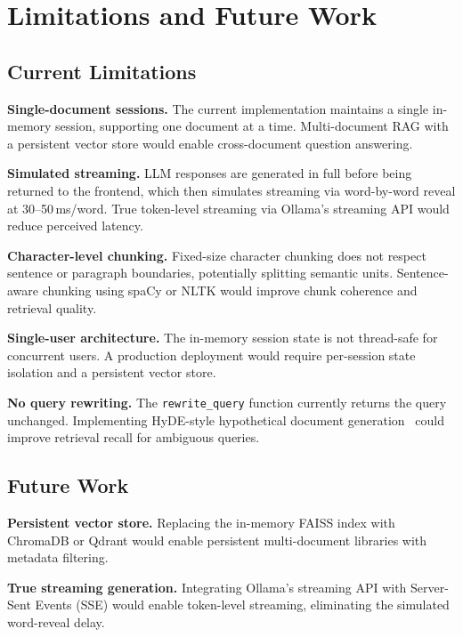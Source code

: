 \documentclass[conference]{IEEEtran}
\begin{document}
\section{Limitations and Future Work}
\label{sec:limits}

\subsection{Current Limitations}

\textbf{Single-document sessions.}
The current implementation maintains a single in-memory session,
supporting one document at a time.
Multi-document RAG with a persistent vector store would enable
cross-document question answering.

\textbf{Simulated streaming.}
LLM responses are generated in full before being returned to the
frontend, which then simulates streaming via word-by-word reveal at
30--50\,ms/word.
True token-level streaming via Ollama's streaming API would reduce
perceived latency.

\textbf{Character-level chunking.}
Fixed-size character chunking does not respect sentence or paragraph
boundaries, potentially splitting semantic units.
Sentence-aware chunking using spaCy or NLTK would improve chunk
coherence and retrieval quality.

\textbf{Single-user architecture.}
The in-memory session state is not thread-safe for concurrent users.
A production deployment would require per-session state isolation and a
persistent vector store.

\textbf{No query rewriting.}
The \texttt{rewrite\_query} function currently returns the query
unchanged.
Implementing HyDE-style hypothetical document generation~\cite{gao2022hyde}
could improve retrieval recall for ambiguous queries.

\subsection{Future Work}

\textbf{Persistent vector store.}
Replacing the in-memory FAISS index with ChromaDB or Qdrant would
enable persistent multi-document libraries with metadata filtering.

\textbf{True streaming generation.}
Integrating Ollama's streaming API with Server-Sent Events (SSE) would
enable token-level streaming, eliminating the simulated word-reveal
delay.
\end{document}
